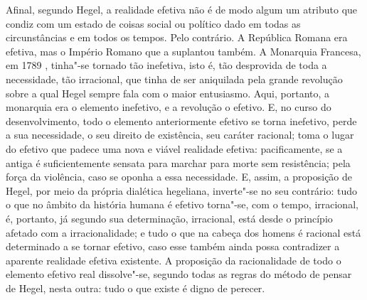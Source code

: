 Afinal,
segundo Hegel,
a realidade efetiva não é de modo algum um atributo que condiz com um
estado de coisas social ou político dado em todas as circunstâncias e em
todos os tempos. Pelo contrário. A República Romana era efetiva, mas o
Império Romano \textbar{} que a suplantou \textbar{} também. A Monarquia Francesa, \textbar{} em
1789 \textbar{}, tinha"-se tornado tão inefetiva, isto é, tão desprovida de toda a
necessidade, tão irracional, que tinha de ser aniquilada pela grande
revolução sobre a qual
Hegel sempre
fala com o maior entusiasmo. Aqui, portanto, a monarquia era o elemento
inefetivo, e a revolução o efetivo. E, no curso do desenvolvimento, todo o
elemento anteriormente efetivo se torna inefetivo, perde a sua
necessidade, o seu direito de existência, seu caráter racional; toma o
lugar do efetivo que padece uma nova e viável realidade efetiva:
pacificamente, se a antiga é suficientemente sensata para marchar para
morte sem resistência; pela força da violência, caso se oponha a essa
necessidade. E, assim, a proposição
de Hegel, por meio da própria dialética
hegeliana, inverte"-se no seu contrário: tudo o que no âmbito da história humana é
efetivo torna"-se, com o tempo, irracional, é, portanto, já segundo sua
determinação, irracional, está desde o princípio afetado com a
irracionalidade; e tudo o que na cabeça dos homens é racional está
determinado a se tornar efetivo, caso esse também ainda possa
contradizer a aparente realidade efetiva existente. A proposição da
racionalidade de todo o elemento efetivo real dissolve"-se, segundo todas
as regras do método de pensar
de Hegel,
nesta outra: tudo o que existe é digno de perecer.

